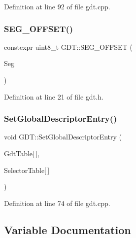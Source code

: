 Definition at line 92 of file gdt.\+cpp.

\mbox{\label{namespace_g_d_t_a3f6672477fedb061897f9c710f539ccb}} 
\subsubsection{\texorpdfstring{S\+E\+G\+\_\+\+O\+F\+F\+S\+E\+T()}{SEG\_OFFSET()}}
{\footnotesize\ttfamily constexpr uint8\+\_\+t G\+D\+T\+::\+S\+E\+G\+\_\+\+O\+F\+F\+S\+ET (\begin{DoxyParamCaption}\item[{const \hyperlink{namespace_g_d_t_af2b09941ee46a489ebaccfed5c839154}{Segment}}]{Seg }\end{DoxyParamCaption})\hspace{0.3cm}{\ttfamily [inline]}}



Definition at line 21 of file gdt.\+h.

\mbox{\label{namespace_g_d_t_a5d0041eb890e6c1f40d8a919494c2354}} 
\subsubsection{\texorpdfstring{Set\+Global\+Descriptor\+Entry()}{SetGlobalDescriptorEntry()}}
{\footnotesize\ttfamily void G\+D\+T\+::\+Set\+Global\+Descriptor\+Entry (\begin{DoxyParamCaption}\item[{Gdt\+Entry}]{Gdt\+Table\mbox{[}$\,$\mbox{]},  }\item[{const \hyperlink{struct_g_d_t_1_1_selector}{Selector}}]{Selector\+Table\mbox{[}$\,$\mbox{]} }\end{DoxyParamCaption})}



Definition at line 74 of file gdt.\+cpp.



\subsection{Variable Documentation}
\mbox{\label{namespace_g_d_t_aab056cef2c3ca53ed66a58f7ae7edfce}} 

